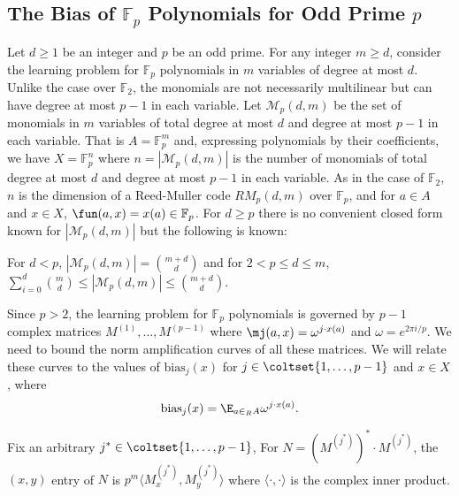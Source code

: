 \newcommand{\val}{\textrm{val}}
\newcommand{\monomial}[3]{\mathcal{M}_{#1}(#2,#3)}
\newcommand{\mjs}{M^{(j^*)}}
\newcommand{\biasj}{\mathrm{bias}_j}
\newcommand{\biasjs}{\mathrm{bias}_{j^*}}




\subsection{The Bias of $\mathbb{F}_p$ Polynomials for Odd Prime $p$}
\label{sec:complex-quadratic}

Let $d\ge 1$ be an integer and $p$ be an odd prime.
For any integer $m\ge d$, consider the learning
problem for $\mathbb{F}_p$ polynomials in $m$ variables of degree at most $d$.
Unlike the case over $\mathbb{F}_2$, the monomials are not necessarily
multilinear but can have degree at most $p-1$ in each variable.
Let $\monomial{p}{d}{m}$ be the set of monomials in $m$ variables of
total degree at most $d$ and degree at most $p-1$ in each
variable.
That is $A=\mathbb{F}_p^m$ and, expressing polynomials by their coefficients,
we have $X=\mathbb{F}_p^n$ where $n=|\monomial{p}{d}{m}|$ is the number of
monomials of total degree at most $d$ and degree at most $p-1$ in each
variable.
As in the case of $\mathbb{F}_2$, $n$ is the dimension of a Reed-Muller code
$RM_p(d,m)$ over $\mathbb{F}_p$, 
and for $a\in A$ and $x\in X$,
$\fun (a,x)=x(a)\in \mathbb{F}_p$.
For $d\ge p$ there is no convenient closed form known for $|\monomial{p}{d}{m}|$
but the following is known:

\begin{proposition}
For $d<p$, $|\monomial{p}{d}{m}|=\binom{m+d}{d}$ and
for $2<p\le d\le m$,
$\sum_{i=0}^d \binom{m}{d}\le |\monomial{p}{d}{m}|\le \binom{m+d}{d}$.
\end{proposition}

Since $p>2$, the learning problem for $\mathbb{F}_p$ polynomials is governed
by $p-1$ complex matrices $M^{(1)},\ldots,M^{(p-1)}$ where
$\mj(a,x)=\omega^{j\cdot x(a)}$ and $\omega=e^{2\pi i/p}$.   
We need to bound the norm amplification curves of all these matrices.
We will relate these curves to the values of $\biasj(x)$ for $j\in \coltset{1,\ldots,p-1}$ and $x\in X$, where
$$\biasj(x)=\E_{a\in_R A} \omega^{j\cdot x(a)}.$$

\begin{sloppypar}
Fix an arbitrary $j^*\in \coltset{1,\ldots,p-1}$,
For $N=(\mjs)^*\cdot \mjs$, the $(x,y)$ entry of $N$ is $p^m \langle \mjs_x,\mjs_y\rangle$
where $\langle \cdot,\cdot\rangle$ is the complex inner product.
\end{sloppypar}

